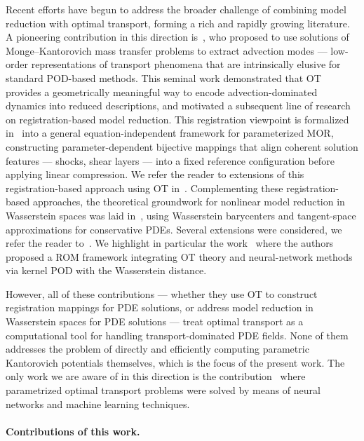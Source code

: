 \documentclass{article}
\begin{document}
Recent efforts have begun to address the broader challenge of combining model reduction with optimal transport, forming a rich and rapidly growing literature. A pioneering contribution in this direction is~\cite{iollo2014advection}, who proposed to use solutions of Monge–Kantorovich mass transfer problems to extract advection modes — low-order representations of transport phenomena that are intrinsically elusive for standard POD-based methods. This seminal work demonstrated that OT provides a geometrically meaningful way to encode advection-dominated dynamics into reduced descriptions, and motivated a subsequent line of research on registration-based model reduction. This registration viewpoint is formalized in~\cite{taddei2020registration} into a general equation-independent framework for parameterized MOR, constructing parameter-dependent bijective mappings that align coherent solution features — shocks, shear layers — into a fixed reference configuration before applying linear compression. We refer the reader to extensions of this registration-based approach using OT in~\cite{iollo2022mapping,cucchiara2024model}. 
Complementing these registration-based approaches, the theoretical groundwork for nonlinear model reduction in Wasserstein spaces was laid in~\cite{ehrlacher2020nonlinear}, using Wasserstein barycenters and tangent-space approximations for conservative PDEs. Several extensions were considered, we refer the reader to~\cite{battisti2023wasserstein,blickhan2024registration, do2025sparse, dalery2026nonlinear, peherstorfer2020model}.  We highlight in particular the work~\cite{khamlich2025optimal} where the authors proposed a ROM framework integrating OT theory and neural-network methods via kernel POD with the Wasserstein distance. 


However, all of these contributions — whether they use OT to construct registration mappings for PDE solutions, or address model reduction in Wasserstein spaces for PDE solutions — treat optimal transport as a computational tool for handling transport-dominated PDE fields. None of them addresses the problem of directly and efficiently computing parametric Kantorovich potentials themselves, which is the focus of the present work. The only work we are aware of in this direction is the contribution~\cite{lacombe2023learning} where parametrized optimal transport problems were solved by means of neural networks and machine learning techniques.




\paragraph{Contributions of this work.}
\end{document}
